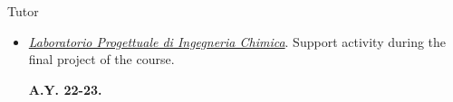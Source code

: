 \begin{position_simple}{Tutor}{\polimi}
\begin{itemize}
    \item[ ]
      \begin{minipage}[t]{0.75\textwidth}
         \ul{\it Laboratorio Progettuale di Ingegneria Chimica}. Support activity during
         the final project of the course.
      \end{minipage}
      \begin{minipage}[t]{0.18\textwidth}
         \begin{flushright}
            \bfseries A.Y. 22-23.
         \end{flushright}
      \end{minipage}
\end{itemize}
\end{position_simple}
